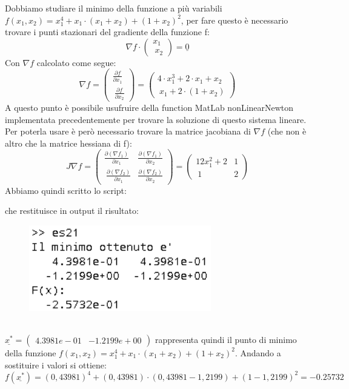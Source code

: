 \begin{flushleft}
Dobbiamo studiare il minimo della funzione a più variabili $f(x_1,x_2)=x_1^4+x_1\cdot(x_1+x_2)+(1+x_2)^2$, per fare questo è necessario trovare i punti stazionari del gradiente della funzione f:
\[
\nabla f \cdot \begin{pmatrix} x_1 \\\ x_2 \end{pmatrix} = \underline{0}
\]
Con $\nabla f$ calcolato come segue:
\[
\nabla f = \begin{pmatrix} \frac{\partial f}{\partial x_1} \\\ \frac{\partial f}{\partial x_2} \end{pmatrix} = \begin{pmatrix} 4\cdot x_1^3+2\cdot x_1 + x_2 \\\ x_1+2\cdot(1+x_2)\end{pmatrix}
\]
A questo punto è possibile usufruire della function MatLab nonLinearNewton implementata precedentemente per trovare la soluzione di questo sistema lineare. Per poterla usare è però necessario trovare la matrice jacobiana di $\nabla f$ (che non è altro che la matrice hessiana di f):
\[
J\nabla f = \begin{pmatrix} \frac{\partial (\nabla f_1)}{\partial x_1} & \frac{\partial (\nabla f_1)}{\partial x_2}  \\\ \frac{\partial (\nabla f_2)}{\partial x_1} & \frac{\partial (\nabla f_2)}{\partial x_2} \end{pmatrix} = \begin{pmatrix} 12x_1^2+2 & 1  \\\ 1 & 2 \end{pmatrix}
\]
Abbiamo quindi scritto lo script:

che restituisce in output il risultato:
\begin{figure}[h]
\includegraphics[left, width=300px]{cap_3/es21/es321}
\end{figure}
\newline \\
$\underline{x^*} = \begin{pmatrix} 4.3981e-01 & -1.2199e+00 \end{pmatrix}$ rappresenta quindi il punto di minimo della funzione $f(x_1,x_2)=x_1^4+x_1\cdot(x_1+x_2)+(1+x_2)^2$. Andando a sostituire i valori si ottiene:
\[
f(\underline{x^*}) = (0,43981)^4+(0,43981)\cdot(0,43981-1,2199)+(1-1,2199)^2 = -0.25732
\]
\end{flushleft}